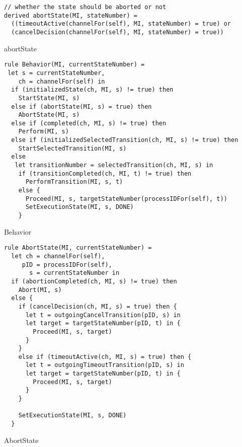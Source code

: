 \begin{listing}[H]
\begin{verbatim}
// whether the state should be aborted or not
derived abortState(MI, stateNumber) =
  ((timeoutActive(channelFor(self), MI, stateNumber) = true) or
  (cancelDecision(channelFor(self), MI, stateNumber) = true))
\end{verbatim}
\caption{abortState}
\label{lst:asm:abortState}
\end{listing}




\begin{listing}[H]
\begin{verbatim}
rule Behavior(MI, currentStateNumber) =
 let s = currentStateNumber,
    ch = channelFor(self) in
  if (initializedState(ch, MI, s) != true) then
    StartState(MI, s)
  else if (abortState(MI, s) = true) then
    AbortState(MI, s)
  else if (completed(ch, MI, s) != true) then
    Perform(MI, s)
  else if (initializedSelectedTransition(ch, MI, s) != true) then
    StartSelectedTransition(MI, s)
  else
   let transitionNumber = selectedTransition(ch, MI, s) in
    if (transitionCompleted(ch, MI, t) != true) then
      PerformTransition(MI, s, t)
    else {
      Proceed(MI, s, targetStateNumber(processIDFor(self), t))
      SetExecutionState(MI, s, DONE)
    }
\end{verbatim}
\caption{Behavior}
\label{lst:asm:Behavior}
\end{listing}




\begin{listing}[H]
\begin{verbatim}
rule AbortState(MI, currentStateNumber) =
  let ch = channelFor(self),
     pID = processIDFor(self),
       s = currentStateNumber in
  if (abortionCompleted(ch, MI, s) != true) then
    Abort(MI, s)
  else {
    if (cancelDecision(ch, MI, s) = true) then {
      let t = outgoingCancelTransition(pID, s) in
      let target = targetStateNumber(pID, t) in {
        Proceed(MI, s, target)
      }
    }
    else if (timeoutActive(ch, MI, s) = true) then {
      let t = outgoingTimeoutTransition(pID, s) in
      let target = targetStateNumber(pID, t) in {
        Proceed(MI, s, target)
      }
    }

    SetExecutionState(MI, s, DONE)
  }
\end{verbatim}
\caption{AbortState}
\label{lst:asm:AbortState}
\end{listing}




